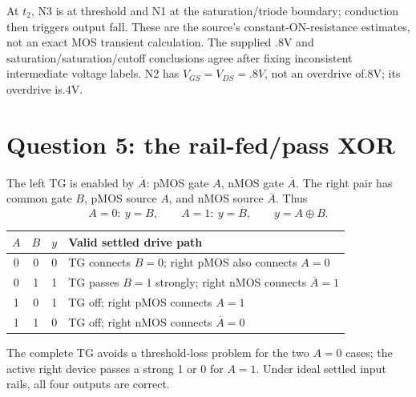 \documentclass[10pt]{article}
\newcommand{\mos}[4]{\begin{scope}[shift={(#1,#2)}]
\draw(0,.24)--(0,-.24);\draw(0,.2)--(.25,.2)--(.25,.5);\draw(0,-.2)--(.25,-.2)--(.25,-.5);
\draw(-.16,.23)--(-.16,-.23);
\ifnum#4=1\draw(-.26,0)circle(.06);\draw(-.75,0)--(-.32,0);\else\draw(-.75,0)--(-.16,0);\fi
\node[anchor=east,font=\scriptsize]at(-.76,0){$#3$};\end{scope}}
\begin{document}
At $t_2$, N3 is at threshold and N1 at the saturation/triode boundary; conduction then triggers output fall. These are the source's constant-ON-resistance estimates, not an exact MOS transient calculation. The supplied .8V and saturation/saturation/cutoff conclusions agree after fixing inconsistent intermediate voltage labels. N2 has $V_{GS}=V_{DS}=.8V$, not an overdrive of.8V; its overdrive is.4V.

\newpage\section*{Question 5: the rail-fed/pass XOR}
The left TG is enabled by $\overline A$: pMOS gate $A$, nMOS gate $\overline A$. The right pair has common gate $B$, pMOS source $A$, and nMOS source $\overline A$. Thus
\[A=0:\ y=B,\qquad A=1:\ y=\overline B,\qquad\boxed{y=A\oplus B}.\]
\begin{center}\begin{tabular}{cccl}\toprule
$A$&$B$&$y$&Valid settled drive path\\\midrule
0&0&0&TG connects $B=0$; right pMOS also connects $A=0$\\
0&1&1&TG passes $B=1$ strongly; right nMOS connects $\overline A=1$\\
1&0&1&TG off; right pMOS connects $A=1$\\
1&1&0&TG off; right nMOS connects $\overline A=0$\\\bottomrule
\end{tabular}\end{center}
The complete TG avoids a threshold-loss problem for the two $A=0$ cases; the active right device passes a strong 1 or 0 for $A=1$. Under ideal settled input rails, all four outputs are correct.
\begin{center}\end{center}
\end{document}
